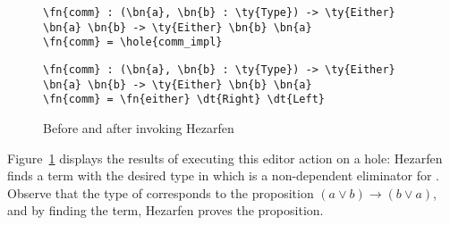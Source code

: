 \begin{figure}[h]
\begin{Verbatim}
\fn{comm} : (\bn{a}, \bn{b} : \ty{Type}) -> \ty{Either} \bn{a} \bn{b} -> \ty{Either} \bn{b} \bn{a}
\fn{comm} = \hole{comm_impl}
\end{Verbatim}
  \vspace{1em}
\begin{Verbatim}
\fn{comm} : (\bn{a}, \bn{b} : \ty{Type}) -> \ty{Either} \bn{a} \bn{b} -> \ty{Either} \bn{b} \bn{a}
\fn{comm} = \fn{either} \dt{Right} \dt{Left}
\end{Verbatim}
\caption{Before and after invoking Hezarfen}
  \label{fig:hezarfen-example}
\end{figure}

Figure~\ref{fig:hezarfen-example} displays the results of
executing this editor action on a hole:
Hezarfen finds a term with the desired type in which  is a non-dependent eliminator for .
Observe that the type of  corresponds to the proposition
$(a \lor b) \to (b \lor a)$, and by finding the term, Hezarfen proves
the proposition.

